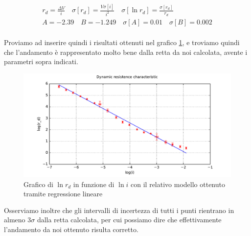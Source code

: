 \begin{gather}
    r_d = \frac{\Delta V}{i} \quad \sigma[r_d] = \frac{V \sigma[i]}{i^2} \quad \sigma[\ln{r_d}] = \frac{\sigma[r_d]}{r_d}
    \\
    A = -2.39 \quad B = -1.249 \quad \sigma[A] = 0.01 \quad \sigma[B] = 0.002
    \\
    \label{eq:regr3}
\end{gather}

Proviamo ad inserire quindi i risultati ottenuti nel grafico \ref{fig:gZr}, e troviamo quindi che l'andamento è rappresentato molto bene dalla retta da noi calcolata, avente i parametri sopra indicati. \\

\begin{figure} [h]
    \centering
    \includegraphics[width=\textwidth]{fig4Z.pdf} 
    \caption{Grafico di $\ln{r_d}$ in funzione di $\ln{i}$ con il relativo modello ottenuto tramite regressione lineare}
    \label{fig:gZr}
\end{figure}

Osserviamo inoltre che gli intervalli di incertezza di tutti i punti rientrano in almeno 3$\sigma$ dalla retta calcolata, per cui possiamo dire che effettivamente l'andamento da noi ottenuto risulta corretto. 